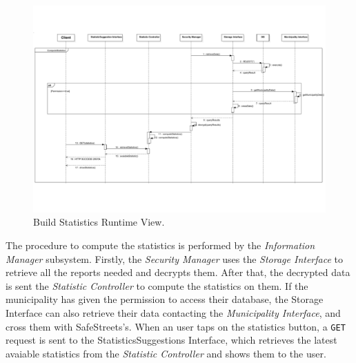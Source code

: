 \documentclass{report}
\begin{document}
\begin{figure}[H]
	\begin{center}
	\includegraphics[width=.88\textwidth]{img/ComputeStatisticss.pdf}
    \end{center}
    \label{fig:ComputeStatisticSD}
	\caption{Build Statistics Runtime View.}
\end{figure}
The procedure to compute the statistics is performed by the \textit{Information Manager} subsystem. Firstly, the \textit{
Security Manager} uses the \textit{Storage Interface} to retrieve all the reports needed and decrypts them.  After that, the decrypted data is sent the \textit{Statistic Controller} to compute the statistics on them. If the municipality has given the permission to access their database, the Storage Interface can also retrieve their data contacting the \textit{Municipality Interface}, and cross them with SafeStreets's.
When an user taps on the statistics button, a \texttt{GET} request is sent to the StatisticsSuggestions Interface, which retrieves the latest avaiable statistics from the \textit{Statistic Controller} and shows them to the user. \vspace{2mm}
\end{document}
